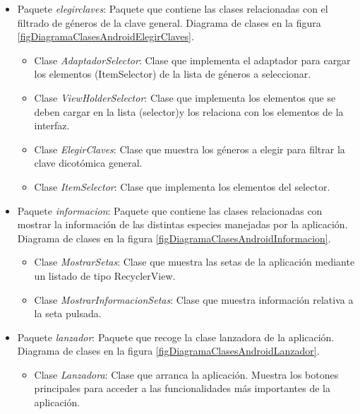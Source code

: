 \begin{itemize}
	
	\item Paquete \textit{elegirclaves}: Paquete que contiene las clases relacionadas con el filtrado de géneros de la clave general. Diagrama de clases en la figura \ref{figDiagramaClasesAndroidElegirClaves}.
	\begin{itemize}
		\item Clase \textit{AdaptadorSelector}: Clase que implementa el adaptador para cargar los elementos (ItemSelector) de la lista de géneros a seleccionar.
		\item Clase \textit{ViewHolderSelector}: Clase que implementa los elementos que se deben cargar en la lista (selector)y los relaciona con los elementos de la interfaz.
		\item Clase \textit{ElegirClaves}: Clase que muestra los géneros a elegir para filtrar la clave dicotómica general.
		\item Clase \textit{ItemSelector}: Clase que implementa los elementos del selector.
	\end{itemize}
	
	
	\item Paquete \textit{informacion}: Paquete que contiene las clases relacionadas con mostrar la información de las distintas especies manejadas por la aplicación. Diagrama de clases en la figura \ref{figDiagramaClasesAndroidInformacion}.
	\begin{itemize}
		\item Clase \textit{MostrarSetas}: Clase que muestra las setas de la aplicación mediante un listado de tipo RecyclerView.
		\item Clase \textit{MostrarInformacionSetas}: Clase que muestra información relativa a la seta pulsada.
	\end{itemize}
	
	
	\item Paquete \textit{lanzador}: Paquete que recoge la clase lanzadora de la aplicación. Diagrama de clases en la figura \ref{figDiagramaClasesAndroidLanzador}.
	\begin{itemize}
		\item Clase \textit{Lanzadora}: Clase que arranca la aplicación. Muestra los botones principales para acceder a las funcionalidades más importantes de la aplicación.
	\end{itemize}
	
	

\end{itemize}
